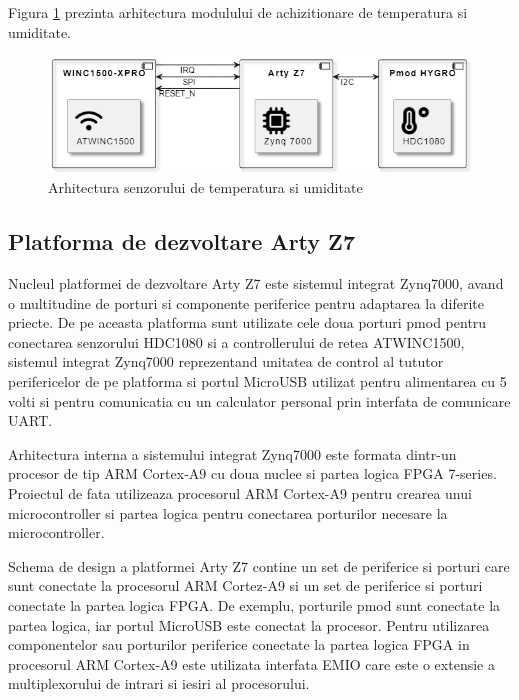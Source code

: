 Figura \ref{fig:PI_SensorUnitDiagram} prezinta arhitectura modulului de achizitionare de temperatura si umiditate.
\begin{figure}[H]
    \centering
    \includegraphics[scale=0.8]{figs/PI_SensorUnitDiagram.png}
    \caption{Arhitectura senzorului de temperatura si umiditate}
    \label{fig:PI_SensorUnitDiagram}
\end{figure}

\subsection{Platforma de dezvoltare Arty Z7}\label{subsec:artyz7_platform}
Nucleul platformei de dezvoltare Arty Z7 este sistemul integrat Zynq7000, avand o multitudine de porturi si componente periferice pentru adaptarea la diferite 
priecte. De pe aceasta platforma sunt utilizate cele doua porturi pmod pentru conectarea senzorului HDC1080 si a controllerului de retea ATWINC1500, sistemul 
integrat Zynq7000 reprezentand unitatea de control al tututor perifericelor de pe platforma si portul MicroUSB utilizat pentru alimentarea cu 5 volti si pentru 
comunicatia cu un calculator personal prin interfata de comunicare UART.

Arhitectura interna a sistemului integrat Zynq7000 este formata dintr-un procesor de tip ARM Cortex-A9 cu doua nuclee si partea logica FPGA 7-series. Proiectul 
de fata utilizeaza procesorul ARM Cortex-A9 pentru crearea unui microcontroller si partea logica pentru conectarea porturilor necesare la microcontroller. 

Schema de design a platformei Arty Z7 contine un set de periferice si porturi care sunt conectate la procesorul ARM Cortez-A9 si un set de periferice si porturi 
conectate la partea logica FPGA. De exemplu, porturile pmod sunt conectate la partea logica, iar portul MicroUSB este conectat la procesor. Pentru utilizarea 
componentelor sau porturilor periferice conectate la partea logica FPGA in procesorul ARM Cortex-A9 este utilizata interfata EMIO care este o extensie a 
multiplexorului de intrari si iesiri al procesorului.

